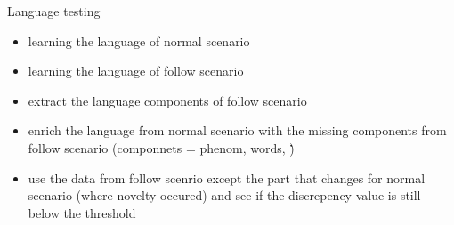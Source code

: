 \begin{frame}{Language testing}
    
    \begin{itemize}
        \item learning the language of normal scenario
        \item learning the language of follow scenario
        \item extract the language components of follow scenario
        \item enrich the language from normal scenario with the missing components from follow scenario (componnets = phenom, words, \.\.\.)
        \item use the data from follow scenrio except the part that changes for normal scenario (where novelty occured) and see if the discrepency value is still below the threshold
    \end{itemize}

\end{frame}